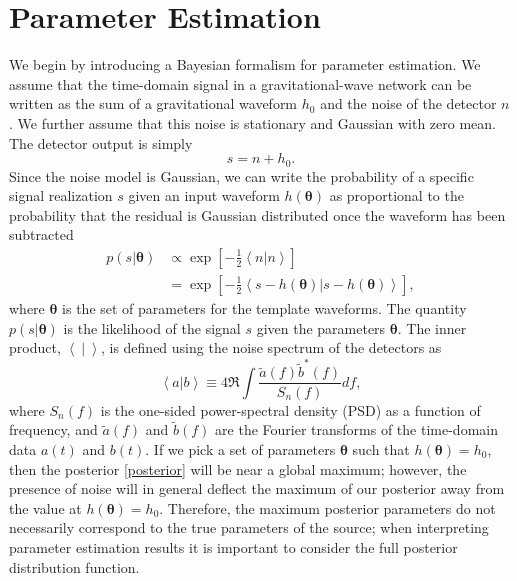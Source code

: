 \documentclass[11pt,a4paper]{emulateapj} 
\newcommand{\thpara}{\boldsymbol{\theta}}
\begin{document}
\section{Parameter Estimation}
\label{PEsection}


We begin by introducing a Bayesian formalism for parameter estimation.
We assume that the time-domain signal in a gravitational-wave network
can be written as the sum of a gravitational waveform $h_0$ and
the noise of the detector $n$.  We further assume that this noise is
stationary and Gaussian with zero mean.  The detector output is simply
\begin{equation}
s = n + h_0 .
\label{SignalAddition}
\end{equation}
Since the noise model is Gaussian, we can write the probability of a
specific signal realization $s$ given an input waveform $h(\thpara)$ as
proportional to the probability that the residual is Gaussian
distributed once the waveform has been subtracted
\begin{align}
  p(s | \thpara) &\propto \exp\left[-\frac{1}{2}\left<n|n
    \right>\right] \nonumber \\ &= \exp\left[-\frac{1}{2}\left < s -
    h(\thpara) | s-h(\thpara)\right >\right] ,
  \label{likelihood}
\end{align}
where $\thpara$ is the set of parameters for the template waveforms.
The quantity $p(s | \thpara)$ is the likelihood of the signal $s$
given the parameters $\thpara$.  The inner product, $\left< ~|~
\right> $, is defined using the noise spectrum of the detectors as
\begin{equation}
  \left<a|b\right> \equiv 4 \Re \int
  \frac{\tilde{a}(f)\tilde{b}^*(f)}{S_n(f)} df ,
  \label{innerProduct}
\end{equation}
where $S_n(f)$ is the one-sided power-spectral density (PSD) as a
function of frequency, and $\tilde{a}(f)$ and $\tilde{b}(f)$ are the
Fourier transforms of the time-domain data $a(t)$ and $b(t)$.  If we
pick a set of parameters $\thpara$ such that $h(\thpara) = h_0$, then
the posterior \eqref{posterior} will be near a global maximum;
however, the presence of noise will in general deflect the maximum of
our posterior away from the value at $h(\thpara) = h_0$.  Therefore, the
maximum posterior parameters do not necessarily correspond to the true
parameters of the source; when interpreting parameter estimation
results it is important to consider the full posterior distribution
function.
 
\end{document}
